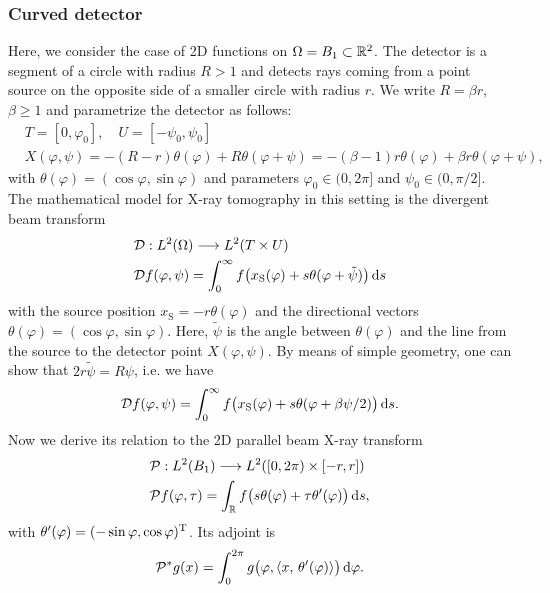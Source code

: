 \documentclass{amsart}
\renewcommand*{\phi}{\varphi}
\begin{document}
\subsubsection{Curved detector}
Here, we consider the case of 2D functions on $\Omega = B_1 \subset {\ensuremath{\mathbb{R}}}^2$. The detector is a segment of a circle with radius $R > 1$ and 
detects rays coming from a point source on the opposite side of a smaller circle with radius $r$. We write $R = \beta r$, $\beta \geq 1$ 
and parametrize the detector as follows:
%
\begin{align*}
 & T = [0, \phi_0],\quad U = [-\psi_0, \psi_0] \\
 & X(\phi, \psi) = -(R - r) \theta(\phi) + R \theta(\phi + \psi) = -(\beta - 1) r \theta(\phi) + \beta r \theta(\phi + \psi),
\end{align*}
%
with $\theta(\phi) = (\cos\phi, \sin\phi)$ and parameters $\phi_0 \in (0, 2\pi]$ and $\psi_0 \in (0, \pi/2]$. The mathematical model 
for X-ray tomography in this setting is the divergent beam transform
%
\begin{align}
 &\OPD: L^2(\Omega) \Lto L^2(T \times U) \notag\\
 \label{eq:fanbeam_fwdproj_otherangle}
 &\OPD f(\phi, \psi) = \int_0^\infty f\big(x_{\mathrm{S}}(\phi) + s \theta(\phi + \tilde\psi)\big)\, \D s
\end{align}
%
with the source position $x_{\mathrm{S}} = -r \theta(\phi)$ and the directional vectors $\theta(\phi) = (\cos\phi, \sin\phi)$. Here, 
$\tilde\psi$ is the angle between $\theta(\phi)$ and the line from the source to the detector point $X(\phi, \psi)$. By means of simple 
geometry, one can show that $2r \tilde\psi = R\psi$, i.e. we have
%
\begin{equation}
 \label{eq:fanbeam_fwdproj_realangle}
 \OPD f(\phi, \psi) = \int_0^\infty f\big(x_{\mathrm{S}}(\phi) + s \theta(\phi + \beta\psi/2)\big)\, \D s.
\end{equation} 
%
Now we derive its relation to the 2D parallel beam X-ray transform
%
\begin{align}
 &\OPP: L^2(B_1) \Lto L^2([0,2\pi) \times [-r,r]) \notag \\
 \label{eq:fanbeam_xray_fwdproj}
 &\OPP f(\phi, \tau) = \int_\RR f\big(s\theta(\phi) + \tau \theta'(\phi)\big)\, \D s,
\end{align} 
%
with $\theta'(\phi) = \TRANSP{(-\sin\phi, \cos\phi)}$. Its adjoint is
%
\begin{equation}
 \label{eq:fanbeam_xray_backproj}
 \DUALOPP g(x) = \int_0^{2\pi} g\big(\phi, \INNER{x}{\theta'(\phi)}\big)\, \D\phi.
\end{equation} 
\end{document}
